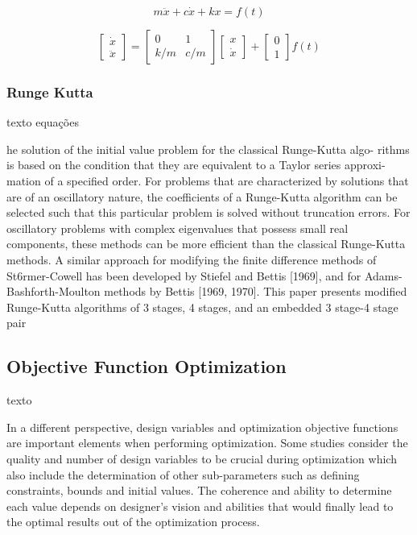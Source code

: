 \begin{equation}
    \label{eq:edo_ex}
    m \ddot x+c \dot x+kx = f(t)
\end{equation}

\begin{equation}
    \label{eq:espaco_de_estados_ex}
    \begin{bmatrix}
        \dot x \\
        \ddot x
    \end{bmatrix}
    =
    \begin{bmatrix}
        0 & 1 \\
        k/m & c/m
    \end{bmatrix}
    \begin{bmatrix}
        x \\
        \dot x
    \end{bmatrix}
    +
    \begin{bmatrix}
        0 \\
        1
    \end{bmatrix}
    f(t)
\end{equation}

\subsubsection{Runge Kutta}
texto
equações

he solution of the initial value problem for the classical Runge-Kutta algo-
rithms is based on the condition that they are equivalent to a Taylor series approxi-
mation of a specified order. For problems that are characterized by solutions that are
of an oscillatory nature, the coefficients of a Runge-Kutta algorithm can be selected
such that this particular problem is solved without truncation errors. For oscillatory
problems with complex eigenvalues that possess small real components, these methods
can be more efficient than the classical Runge-Kutta methods. A similar approach for
modifying the finite difference methods of St6rmer-Cowell has been developed by
Stiefel and Bettis [1969], and for Adams-Bashforth-Moulton methods by Bettis
[1969, 1970]. This paper presents modified Runge-Kutta algorithms of 3 stages, 4
stages, and an embedded 3 stage-4 stage pair


\subsection{Objective Function Optimization}
texto

In a different perspective, design variables and optimization objective functions are important
elements when performing optimization. Some studies consider the quality and number of design
variables to be crucial during optimization which also include the determination of other sub-parameters
such as defining constraints, bounds and initial values. The coherence and ability to determine each
value depends on designer’s vision and abilities that would finally lead to the optimal results out of the
optimization process.



